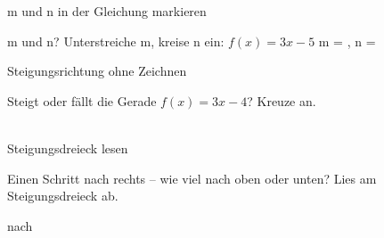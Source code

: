 \setcounter{aufgabe}{11}

\begin{aufgabe}{m und n in der Gleichung markieren}
\begin{teile}
\teil m und n? Unterstreiche m, kreise n ein: $f(x) = 3x - 5$ m = \leerfeld , n = \leerfeld
\end{teile}
\end{aufgabe}

\begin{aufgabe}{Steigungsrichtung ohne Zeichnen}
\begin{teile}
\teil Steigt oder fällt die Gerade $f(x) = 3x - 4$? Kreuze an. \\  \\ 
\end{teile}
\end{aufgabe}

\begin{aufgabe}{Steigungsdreieck lesen}
\begin{teile}
\teil Einen Schritt nach rechts – wie viel nach oben oder unten? Lies am Steigungsdreieck ab.

\begin{ksys}[xmin=-4,xmax=4,ymin=-5,ymax=5,ablesen]   \end{ksys}
\leerfeld nach \leerfeld \leerfeld
\end{teile}
\end{aufgabe}

